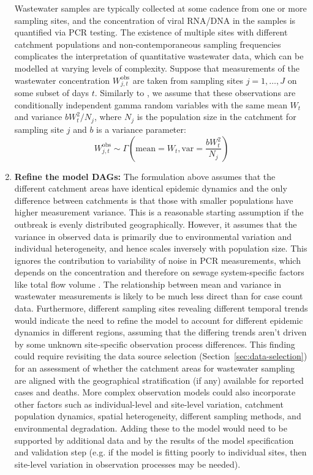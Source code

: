 \documentclass{article}
\begin{document}
\begin{enumerate}
   Wastewater samples are typically collected at some cadence from one or more sampling sites, and the concentration of viral \ac{RNA}/\ac{DNA} in the samples is quantified via \ac{PCR} testing. The existence of multiple sites with different catchment populations and non-contemporaneous sampling frequencies complicates the interpretation of quantitative wastewater data, which can be modelled at varying levels of complexity.   
   Suppose that measurements of the wastewater concentration $W^\mathrm{obs}_{j,t}$ are taken from sampling sites $j=1,\ldots, J$ on some subset of days $t$. Similarly to \citep{watson2024jointly}, we assume that these observations are conditionally independent gamma random variables with the same mean $W_t$ and variance $b W_t^2/N_j$, where $N_j$ is the population size in the catchment for sampling site $j$ and $b$ is a variance parameter:
    \begin{equation}
        W^\mathrm{obs}_{j,t} \sim \Gamma\left(\mathrm{mean}= W_t,  \mathrm{var}=\frac{b W_t^2}{N_j} \right)
    \end{equation}

       
\item \textbf{Refine the model DAGs:}  The formulation above assumes that the different catchment areas have identical epidemic dynamics and the only difference between catchments is that those with smaller populations have higher measurement variance. This is a reasonable starting assumption if the outbreak is evenly distributed geographically. However, it assumes that the variance in observed data is primarily due to environmental variation and individual heterogeneity, and hence scales inversely with population size. This ignores the contribution to variability of noise in \ac{PCR} measurements, which depends on the concentration and therefore on sewage system-specific factors like total flow volume \citep{lison2024improving}. The relationship between mean and variance in wastewater measurements is likely to be much less direct than for case count data. Furthermore, different sampling sites revealing different temporal trends would indicate the need to refine the model to account for different epidemic dynamics in different regions, assuming that the differing trends aren't driven by some unknown site-specific observation process differences. This finding could require revisiting the data source selection (Section~\ref{sec:data-selection}) for an assessment of whether the catchment areas for wastewater sampling are aligned with the geographical stratification (if any) available for reported cases and deaths. More complex observation models could also incorporate other factors such as individual-level and site-level variation, catchment population dynamics, spatial heterogeneity, different sampling methods, and environmental degradation. Adding these to the model would need to be supported by additional data and by the results of the model specification and validation step (e.g. if the model is fitting poorly to individual sites, then site-level variation in observation processes may be needed).


\end{enumerate}
\end{document}

